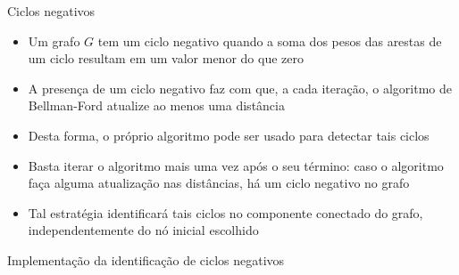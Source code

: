 \begin{frame}[fragile]{Ciclos negativos}

    \begin{itemize}
        \item Um grafo $G$ tem um ciclo negativo quando a soma dos pesos das arestas de um
            ciclo resultam em um valor menor do que zero

        \item A presença de um ciclo negativo faz com que, a cada iteração, o algoritmo de
            Bellman-Ford atualize ao menos uma distância

        \item Desta forma, o próprio algoritmo pode ser usado para detectar tais ciclos

        \item Basta iterar o algoritmo mais uma vez após o seu término: caso o algoritmo faça
            alguma atualização nas distâncias, há um ciclo negativo no grafo

        \item Tal estratégia identificará tais ciclos no componente conectado do grafo, 
            independentemente do nó inicial escolhido
    \end{itemize}

\end{frame}

\begin{frame}[fragile]{Implementação da identificação de ciclos negativos}
\end{frame}
